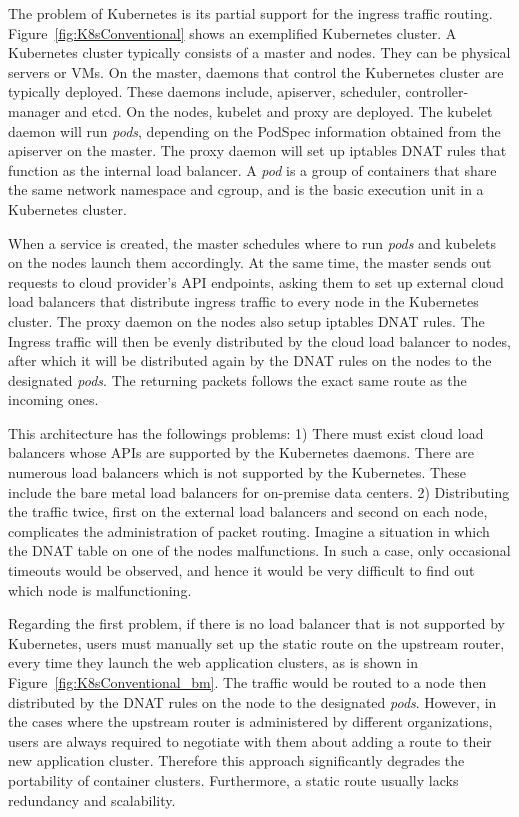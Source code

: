 The problem of Kubernetes is its partial support for the ingress traffic routing.
Figure~\ref{fig:K8sConventional} shows an exemplified Kubernetes cluster.
A Kubernetes cluster typically consists of a master and nodes. They can be physical servers or VMs.
On the master, daemons that control the Kubernetes cluster are typically deployed. 
These daemons include, apiserver, scheduler, controller-manager and etcd. 
On the nodes, kubelet and proxy are deployed.
The kubelet daemon will run {\it pods}, depending on the PodSpec information obtained from the apiserver on the master.
The proxy daemon will set up iptables DNAT rules that function as the internal load balancer.
A {\em pod} is a group of containers that share the same network namespace and cgroup,
and is the basic execution unit in a Kubernetes cluster.

When a service is created, the master schedules where to run {\em pods} and kubelets on the nodes launch them accordingly.
At the same time, the master sends out requests to cloud provider's API endpoints, asking them to set up external cloud load balancers that distribute ingress traffic to every node in the Kubernetes cluster.
The proxy daemon on the nodes also setup iptables DNAT\cite{MartinA.Brown2017} rules. 
The Ingress traffic will then be evenly distributed by the cloud load balancer to nodes, 
after which it will be distributed again by the DNAT rules on the nodes to the designated {\em pods}. 
The returning packets follows the exact same route as the incoming ones.

This architecture has the followings problems: 
1) There must exist cloud load balancers whose APIs are supported by the Kubernetes daemons.
There are numerous load balancers which is not supported by the Kubernetes.
These include the bare metal load balancers for on-premise data centers.
2) Distributing the traffic twice, first on the external load balancers and second on each node, complicates the administration of packet routing. 
Imagine a situation in which the DNAT table on one of the nodes malfunctions.
In such a case, only occasional timeouts would be observed, and hence it would be very difficult to find out which node is malfunctioning.   

Regarding the first problem, if there is no load balancer that is not supported by Kubernetes, users must manually set up the static route on the upstream router, every time they launch the web application clusters, as is shown in Figure~\ref{fig:K8sConventional_bm}.
The traffic would be routed to a node then distributed by the DNAT rules on the node to the designated {\em pods}.
However, in the cases where the upstream router is administered by different organizations, users are always required to negotiate with them about adding a route to their new application cluster.
Therefore this approach significantly degrades the portability of container clusters.
Furthermore, a static route usually lacks redundancy and scalability.


